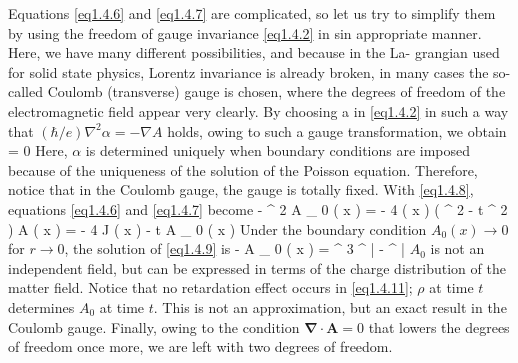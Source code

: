 Equations \eqref{eq1.4.6} and \eqref{eq1.4.7} are complicated, so let us try to simplify them by using the freedom of gauge invariance \eqref{eq1.4.2} in sin appropriate manner. Here, we have many different possibilities, and because in the La- grangian used for solid state physics, Lorentz invariance is already broken, in many cases the so-called Coulomb (transverse) gauge is chosen, where the degrees of freedom of the electromagnetic field appear very clearly. By choosing a in \eqref{eq1.4.2} in such a way that $( \hbar / e ) \nabla ^ { 2 } \alpha = - \nabla A$ holds, owing to such a gauge transformation, we obtain
\be\label{eq1.4.8}
\nabla \cdot {} = 0
\ee
Here, $\alpha$ is determined uniquely when boundary conditions are imposed because of the uniqueness of the solution of the Poisson equation. Therefore, notice that in the Coulomb gauge, the gauge is totally fixed. With \eqref{eq1.4.8}, equations \eqref{eq1.4.6} and \eqref{eq1.4.7} become
\be\label{eq1.4.9}
- \nabla ^ { 2 } A _ { 0 } ( x ) = - 4 \pi \rho ( x )
\ee
\be\label{eq1.4.10}
\left( \nabla ^ { 2 } -  { \partial t ^ { 2 } } \right) A ( x ) = - 4 \pi J ( x ) - \frac { \partial } { \partial t } \nabla A _ { 0 } ( x )
\ee
Under the boundary condition $A _ { 0 } ( x ) \rightarrow 0$ for $r \rightarrow 0$, the solution of \eqref{eq1.4.9} is
\be\label{eq1.4.11}
- A _ { 0 } ( x ) = \int {} ^ { 3 }  ^ { \prime }  { \left|  -  ^ { \prime } \right| }
\ee
$A_0$ is not an independent field, but can be expressed in terms of the charge distribution of the matter field. Notice that no retardation effect occurs in \eqref{eq1.4.11}; $\rho$ at time $t$ determines $A _ { 0 }$ at time $t$. This is not an approximation, but an exact result in the Coulomb gauge. Finally, owing to the condition $\boldsymbol { \nabla } \cdot \boldsymbol { A } = 0$ that lowers the degrees of freedom once more, we are left with two degrees of freedom.

